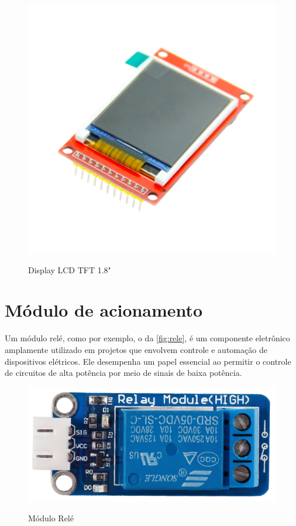\begin{figure}[h!]
    \centering
    \caption{Display LCD TFT 1.8"}
    \includegraphics[scale=0.5]{figuras/tftst7735.png}
    \label{fig:tft7735}
    \centering
\end{figure}

\section{Módulo de acionamento}\label{sec:acionamento}

Um módulo relé, como por exemplo, o da \autoref{fig:rele}, é um componente 
eletrônico amplamente utilizado em projetos que envolvem controle 
e automação de dispositivos elétricos. Ele desempenha 
um papel essencial ao permitir o controle de circuitos 
de alta potência por meio de sinais de baixa potência.

\begin{figure}[h!]
    \centering
    \caption{Módulo Relé}
    \includegraphics[scale=1]{figuras/rele.png}
    \label{fig:rele}
    \centering
\end{figure}

